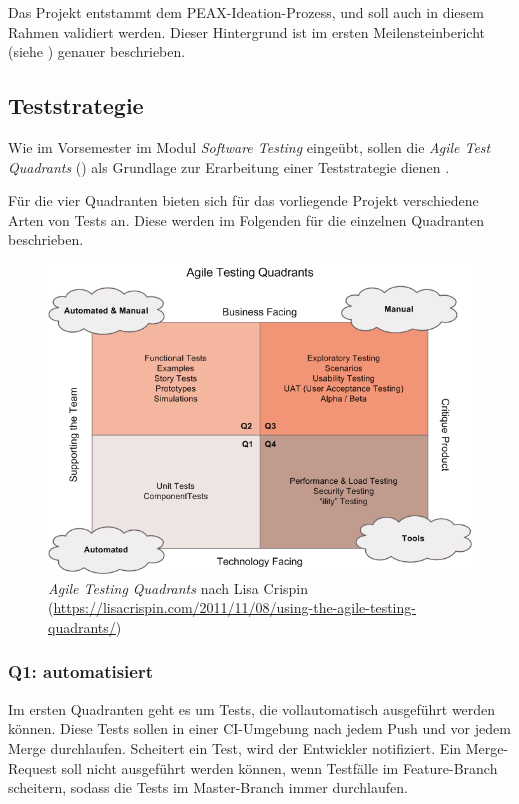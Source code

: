 Das Projekt entstammt dem PEAX-Ideation-Prozess, und soll auch in diesem Rahmen validiert werden. Dieser Hintergrund ist im ersten Meilensteinbericht (siehe ) genauer beschrieben.

\subsection{Teststrategie}

Wie im Vorsemester im Modul \textit{Software Testing} eingeübt, sollen die \textit{Agile Test Quadrants} () als Grundlage zur Erarbeitung einer Teststrategie dienen \cite[p. 242]{agiletest}.

Für die vier Quadranten bieten sich für das vorliegende Projekt verschiedene Arten von Tests an. Diese werden im Folgenden für die einzelnen Quadranten beschrieben.

\begin{figure}
	\centering
	\includegraphics[width=\linewidth]{pics/agile-testing-quadrants.png}
	\caption{\textit{Agile Testing Quadrants} nach Lisa Crispin (\url{https://lisacrispin.com/2011/11/08/using-the-agile-testing-quadrants/})}
	\label{fig:agile-testing-quadrants}
\end{figure}

\subsubsection{Q1: automatisiert}

Im ersten Quadranten geht es um Tests, die vollautomatisch ausgeführt werden können. Diese Tests sollen in einer CI-Umgebung nach jedem Push und vor jedem Merge durchlaufen. Scheitert ein Test, wird der Entwickler notifiziert. Ein Merge-Request soll nicht ausgeführt werden können, wenn Testfälle im Feature-Branch scheitern, sodass die Tests im Master-Branch immer durchlaufen.

